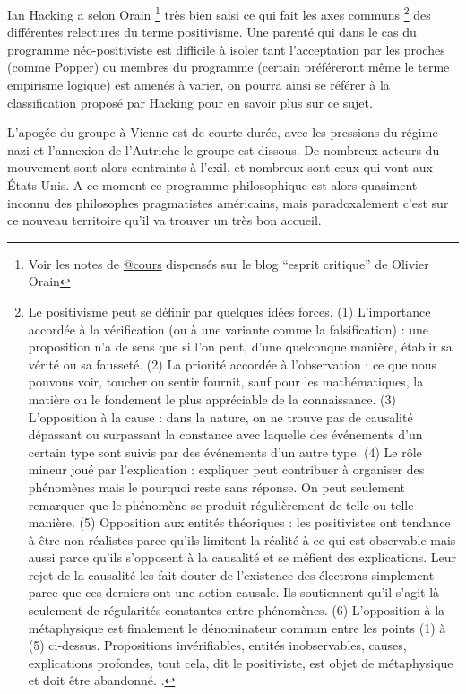Ian Hacking \autocite{Hacking1983} a selon Orain \footnote{Voir les notes de \href{http://www.esprit-critique.net/article-12642840.html}{@cours} dispensés sur le blog \enquote{esprit critique} de Olivier Orain} très bien saisi ce qui fait les axes communs \footnote{Le positivisme peut se définir par quelques idées forces. (1) L’importance accordée à la vérification (ou à une variante comme la falsification) : une proposition n’a de sens que si l’on peut, d’une quelconque manière, établir sa vérité ou sa fausseté. (2) La priorité accordée à l’observation : ce que nous pouvons voir, toucher ou sentir fournit, sauf pour les mathématiques, la matière ou le fondement le plus appréciable de la connaissance. (3) L’opposition à la cause : dans la nature, on ne trouve pas de causalité dépassant ou surpassant la constance avec laquelle des événements d’un certain type sont suivis par des événements d’un autre type. (4) Le rôle mineur joué par l’explication : expliquer peut contribuer à organiser des phénomènes mais le pourquoi reste sans réponse. On peut seulement remarquer que le phénomène se produit régulièrement de telle ou telle manière. (5) Opposition aux entités théoriques : les positivistes ont tendance à être non réalistes parce qu’ils limitent la réalité à ce qui est observable mais aussi parce qu’ils s’opposent à la causalité et se méfient des explications. Leur rejet de la causalité les fait douter de l’existence des électrons simplement parce que ces derniers ont une action causale. Ils soutiennent qu’il s’agit là seulement de régularités constantes entre phénomènes. (6) L’opposition à la métaphysique est finalement le dénominateur commun entre les points (1) à (5) ci-dessus. Propositions invérifiables, entités inobservables, causes, explications profondes, tout cela, dit le positiviste, est objet de métaphysique et doit être abandonné. \autocite[82]{Hacking1983}.} des différentes relectures du terme positivisme. Une parenté qui dans le cas du programme néo-positiviste est difficile à isoler tant l'acceptation par les proches (comme Popper) ou membres du programme (certain préféreront même le terme empirisme logique) est amenés à varier, on pourra ainsi se référer à la classification proposé par Hacking pour en savoir plus sur ce sujet. \autocite[81-86]{Hacking1983}

L'apogée du groupe à Vienne est de courte durée, avec les pressions du régime nazi et l'annexion de l'Autriche le groupe est dissous. De nombreux acteurs du mouvement sont alors contraints à l'exil, et nombreux sont ceux qui vont aux États-Unis. A ce moment ce programme philosophique est alors quasiment inconnu des philosophes pragmatistes américains, mais paradoxalement c'est sur ce nouveau territoire qu'il va trouver un très bon accueil. 


